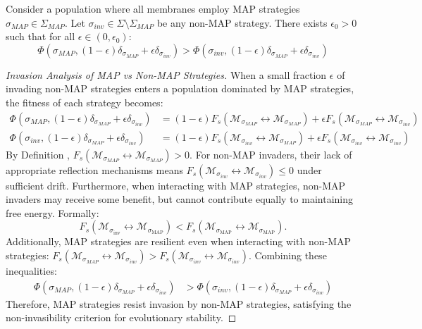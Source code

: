 \begin{lemma}
\label{lemma:bk5_covenant_non_invasibility}
Consider a population where all membranes employ MAP strategies $\sigma_{MAP} \in \Sigma_{MAP}$. Let $\sigma_{inv} \in \Sigma \setminus \Sigma_{MAP}$ be any non-MAP strategy. There exists $\epsilon_0 > 0$ such that for all $\epsilon \in (0, \epsilon_0)$:
\begin{equation}
\Phi(\sigma_{MAP}, (1-\epsilon)\delta_{\sigma_{MAP}} + \epsilon\delta_{\sigma_{inv}}) > \Phi(\sigma_{inv}, (1-\epsilon)\delta_{\sigma_{MAP}} + \epsilon\delta_{\sigma_{inv}})
\end{equation}
\end{lemma}
\begin{proof}[Invasion Analysis of MAP vs Non-MAP Strategies]
\label{proof:bk5_map_invasion_dynamics}
When a small fraction $\epsilon$ of invading non-MAP strategies enters a population dominated by MAP strategies, the fitness of each strategy becomes:
\begin{align}
\Phi(\sigma_{MAP}, (1-\epsilon)\delta_{\sigma_{MAP}} + \epsilon\delta_{\sigma_{inv}}) &= (1-\epsilon)F_s(\mathscr{M}_{\sigma_{MAP}} \leftrightarrow \mathscr{M}_{\sigma_{MAP}}) + \epsilon F_s(\mathscr{M}_{\sigma_{MAP}} \leftrightarrow \mathscr{M}_{\sigma_{inv}}) \\
\Phi(\sigma_{inv}, (1-\epsilon)\delta_{\sigma_{MAP}} + \epsilon\delta_{\sigma_{inv}}) &= (1-\epsilon)F_s(\mathscr{M}_{\sigma_{inv}} \leftrightarrow \mathscr{M}_{\sigma_{MAP}}) + \epsilon F_s(\mathscr{M}_{\sigma_{inv}} \leftrightarrow \mathscr{M}_{\sigma_{inv}})
\end{align}
By Definition , $F_s(\mathscr{M}_{\sigma_{MAP}} \leftrightarrow \mathscr{M}_{\sigma_{MAP}}) > 0$.
For non-MAP invaders, their lack of appropriate reflection mechanisms means $F_s(\mathscr{M}_{\sigma_{inv}} \leftrightarrow \mathscr{M}_{\sigma_{inv}}) \leq 0$ under sufficient drift.
Furthermore, when interacting with MAP strategies, non-MAP invaders may receive some benefit,
but cannot contribute equally to maintaining free energy. Formally:
\[
F_s\left(\mathscr{M}_{\sigma_{\text{inv}}} \leftrightarrow \mathscr{M}_{\sigma_{\text{MAP}}}\right) 
< 
F_s\left(\mathscr{M}_{\sigma_{\text{MAP}}} \leftrightarrow \mathscr{M}_{\sigma_{\text{MAP}}}\right).
\]
Additionally, MAP strategies are resilient even when interacting with non-MAP strategies: $F_s(\mathscr{M}_{\sigma_{MAP}} \leftrightarrow \mathscr{M}_{\sigma_{inv}}) > F_s(\mathscr{M}_{\sigma_{inv}} \leftrightarrow \mathscr{M}_{\sigma_{inv}})$.
Combining these inequalities:
\begin{align}
\Phi(\sigma_{MAP}, (1-\epsilon)\delta_{\sigma_{MAP}} + \epsilon\delta_{\sigma_{inv}}) &> \Phi(\sigma_{inv}, (1-\epsilon)\delta_{\sigma_{MAP}} + \epsilon\delta_{\sigma_{inv}})
\end{align}
Therefore, MAP strategies resist invasion by non-MAP strategies, satisfying the non-invasibility criterion for evolutionary stability.
\end{proof}
